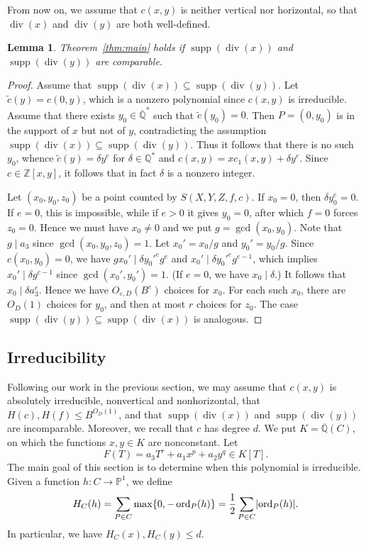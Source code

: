 \documentclass[a4paper,11pt,twoside,reqno]{amsart}
\newtheorem{lemma}[theorem]{Lemma}
\theoremstyle{definition}
\theoremstyle{remark}
\numberwithin{equation}{section}
\newcommand\ve{\varepsilon}
\newcommand\ZZ{\mathbb{Z}}
\newcommand\supp{\operatorname{supp}}
\newcommand\ord{\operatorname{ord}}
\newcommand\Q{\mathbb{Q}}
\newcommand\1{\mathbf{1}}
\renewcommand{\leq}{\leqslant}
\DeclarePairedDelimiter\abs{\lvert}{\rvert}
\begin{document}
From now on, we assume that $c(x,y)$ is neither vertical nor horizontal, so that $\operatorname{div}(x)$ and $\operatorname{div}(y)$ are both well-defined.

\begin{lemma}\label{lem:monomial}
Theorem~\ref{thm:main} holds if 
$\supp(\operatorname{div}(x))$ and $\supp(\operatorname{div}(y))$ are comparable. 
\end{lemma}

\begin{proof}
Assume that $\supp(\operatorname{div}(x))\subseteq\supp(\operatorname{div}(y))$.
	Let $\tilde{c}(y)=c(0,y)$, which is a nonzero polynomial since $c(x,y)$ is irreducible. Assume that there exists $y_0\in\overline{\Q}^*$ such that $\tilde{c}(y_0)=0$. Then 
	$P=(0,y_0)$ is in the support of $x$ but not of $y$, contradicting the assumption $\supp(\operatorname{div}(x))\subseteq\supp(\operatorname{div}(y))$. Thus it follows that 
	there is no such $y_0$, whence $\tilde{c}(y)=\delta y^e$ for $\delta\in \Q^*$ and $c(x,y)=xc_1(x,y)+\delta y^e$. Since $c\in \ZZ[x,y]$, it follows that in fact $\delta$ is a nonzero integer. 
	
	Let $(x_0,y_0,z_0)$ be a point counted by $S(X,Y,Z,f,c)$. 
	If $x_0=0$, then $\delta y_0^e=0$. If $e=0$, this is
impossible, while if $e>0$ it gives $y_0=0$, after which
$f=0$ forces $z_0=0$.
Hence we must have $x_0\neq 0$ and we put $g=\gcd(x_0,y_0)$. Note that $g\mid a_3$ since $\gcd(x_0,y_0,z_0)=1$. Let $x_0'=x_0/g$ and $y_0'=y_0/g$. Since $c(x_0,y_0)=0$, we have $gx_0'\mid \delta y_0'^eg^e$ and $x_0'\mid \delta y_0'^eg^{e-1}$, which implies $x_0'\mid \delta g^{e-1}$ since $\gcd(x_0',y_0')=1$. (If $e=0$, we have $x_0\mid \delta$.) 
	It follows that $x_0\mid \delta a_3^e$. Hence we have $O_{\ve,D}(B^{\ve})$ choices for $x_0$. For each such $x_0$, there are $O_D(1)$ choices for $y_0$, and then at most $r$ choices for $z_0$.
 The case $\supp(\operatorname{div}(y))\subseteq\supp(\operatorname{div}(x))$ is analogous.
\end{proof}

\subsection{Irreducibility}

Following our work in the previous section, we may assume that $c(x,y)$ is absolutely irreducible,
nonvertical and nonhorizontal, 
that $H(c),H(f)\leq B^{O_D(1)}$, 
and 
that $\supp(\operatorname{div}(x))$ and $ \supp(\operatorname{div}(y))$ are incomparable.
Moreover, we recall that $c$ has degree $d$.
We put $K=\overline{\Q}(C)$, on which the functions $x,y\in K$ are nonconstant.
Let 
\begin{equation}\label{eq:FF}
F(T)=a_3T^r+a_1x^p+a_2y^q\in K[T].
\end{equation} 
The main goal of this section is to determine when this polynomial is irreducible.
Given a function $h:C\to\mathbb{P}^1$, we define
\begin{equation}\label{eq:2deg}
 H_C(h)=\sum_{P\in C}\max\{0,-\ord_P(h)\}=\frac 12 \sum_{P\in C}\abs{\ord_P(h)}.
\end{equation}
In particular, we have $H_C(x), H_C(y)\leq d$.
\end{document}
